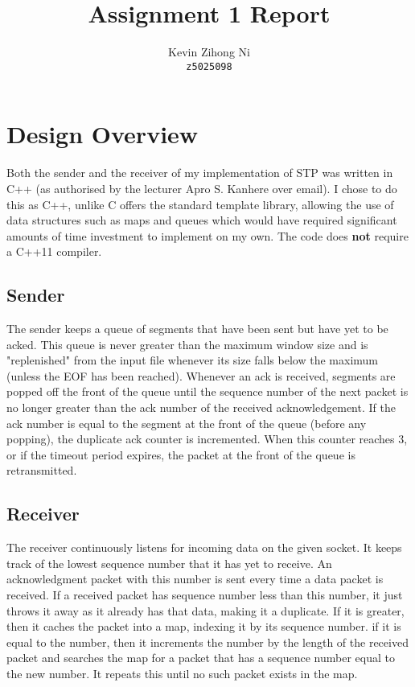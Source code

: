 \documentclass[a4paper]{article}
\title{Assignment 1 Report}
\author{Kevin Zihong Ni\\\texttt{z5025098}}
\begin{document}
\maketitle

\section{Design Overview}

Both the sender and the receiver of my implementation of STP was written in C++ (as authorised by the lecturer Apro S. Kanhere
over email). I chose to do this as C++, unlike C offers the standard template library, allowing the use of data structures such as
maps and queues which would have required significant amounts of time investment to implement on my own. The code does 
\textbf{not} require a C++11 compiler.

\subsection{Sender}
The sender keeps a queue of segments that have been sent but have yet to be acked. This queue is never greater than the maximum
window size and is "replenished" from the input file whenever its size falls below the maximum (unless the EOF has been reached).
Whenever an ack is received, segments are popped off the front of the queue until the sequence number of the
next packet is no longer greater than the ack number of the received acknowledgement. If the ack number is equal to the segment
at the front of the queue (before any popping), the duplicate ack counter is incremented. When this counter reaches 3, or if the
timeout period expires, the packet at the front of the queue is retransmitted.

\subsection{Receiver}
The receiver continuously listens for incoming data on the given socket. It keeps track of the lowest sequence number that it has
yet to receive. An acknowledgment packet with this number is sent every time a data packet is received.
If a received packet has sequence number less than this number, it just throws it away as it already has that
data, making it a duplicate. If it is greater, then it caches the packet into a map, indexing it by its sequence number.
if it is equal to the number, then it increments the number by the length of the received packet and searches the map
for a packet that has a sequence number equal to the new number. It repeats this until no such packet exists in the map.
\end{document}
